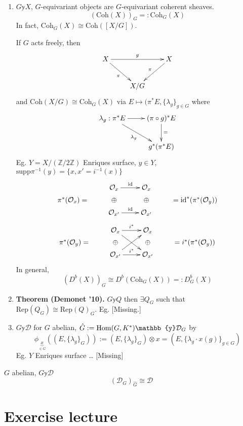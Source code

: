 \begin{example}
\label{example-G-equivariant-objects}
\begin{enumerate}
\item $G\mathbb{y}X$, $G$-equivariant objects are $G$-equivariant coherent
sheaves.
$$
(\text{Coh}(X))_G=:\text{Coh}_G(X)
$$
In fact, $\text{Coh}_G(X)\cong \text{Coh}([X/G])$.

If $G$ acts freely, then
$$
\xymatrix{
X\ar[dr]_{\pi}\ar[rr]^g &  &  X\ar[dl]_{\pi}\\
&X/G
}
$$
and $\text{Coh}(X/G)\cong \text{Coh}_G(X)$ via $E \mapsto (\pi^*
E,\{\lambda_g\}_{g \in G}$ where
$$
\xymatrix{
\lambda_g:\pi^* E\ar[dr]_{\lambda_g}\ar[r]& (\pi \circ g)^* E\ar[d]^=\\
&g^*(\pi^*E)
}
$$
Eg. $Y=X/(\mathbb{Z}/2\mathbb{Z})$ Enriques surface, $y \in Y$,
$\text{supp}\pi^{-1}(y)=\{x,x'=i^{-1}(x)\}$ 
$$
\xymatrixrowsep{.2em}
\xymatrix{
&\mathcal{O}_x\ar[r]^{\text{id}}&\mathcal{O}_x\\
\pi^* (\mathcal{O}_x)=&\oplus&\oplus&=\text{id}^*(\pi^*(\mathcal{O}_y))\\
&\mathcal{O}_{x'}\ar[r]^{\text{id}}&\mathcal{O}_{x'}
}
$$
$$
\xymatrixrowsep{.2em}
\xymatrix{
&\mathcal{O}_x\ar[r]^{i^*}\ar[ddr]&\mathcal{O}_x\\
\pi^* (\mathcal{O}_y)=&\oplus&\oplus&=i^*(\pi^*(\mathcal{O}_y))\\
&\mathcal{O}_{x'}\ar[r]^{i^*}\ar[uur]&\mathcal{O}_{x'}
}
$$
In general,
$$
(D^b(X))_G\cong D^b(\text{Coh}_G(X))=:D^b_G(X)
$$
\item {\bf Theorem (Demonet '10).} $G\mathbb{y} Q$ then $\exists Q_G$ such that
$\text{Rep}(Q_G)\cong\text{Rep}(Q)_G$. Eg. [Missing.]

\item $G \mathbb{y} \mathcal{D}$ for $G$ abelian,
$\hat{G}:=\Hom(G,K^*)\mathbb{y}\mathcal{D}_G$ by 
$$
\phi_{\underbrace{x}_{\in G}}((E,\{\lambda_g\}_G))
:=(E,\{\lambda_g\}_G)\otimes x=(E,\{\lambda_g\cdot x(g)\}_{g \in G})
$$
Eg. $Y$ Enriques surface … [Missing]
\end{enumerate}
\end{example}
 
\begin{theorem}[Elagin '15]
\label{theorem-Elagin}
$G$ abelian, $G\mathbb{y}\mathcal{D}$
$$
(\mathcal{D}_G)_{\hat{G}}\cong \mathcal{D}
$$
\end{theorem}

\section{Exercise lecture}
\label{section-exercise-lecture}

